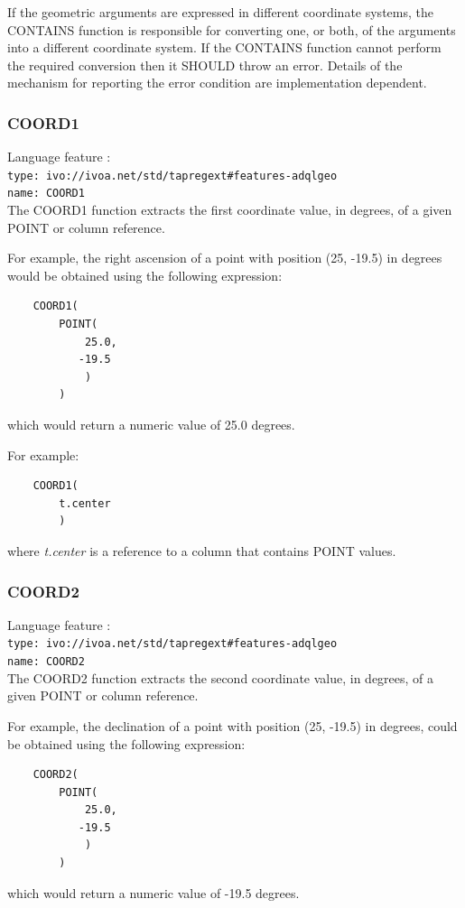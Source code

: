 \documentclass[11pt,a4paper]{ivoa}
\begin{document}
If the geometric arguments are expressed in different coordinate systems,
the CONTAINS function is responsible for converting one, or both, of the
arguments into a different coordinate system.
If the CONTAINS function cannot perform the required conversion then
it SHOULD throw an error.
Details of the mechanism for reporting the error condition are
implementation dependent.

\subsubsection{COORD1}
\label{sec:functions.geom.coord1}
{\footnotesize Language feature :}\\
{\footnotesize \verb|type: ivo://ivoa.net/std/tapregext#features-adqlgeo|}\\
{\footnotesize \verb|name: COORD1|}\\

The COORD1 function extracts the first coordinate value, in degrees, of a given
POINT  or column reference.

For example, the right ascension of a point with position (25, -19.5) in
degrees would be obtained using the following expression:
\begin{verbatim}
    COORD1(
        POINT(
            25.0,
           -19.5
            )
        )
\end{verbatim}
\noindent
which would return a numeric value of 25.0 degrees.

For example:
\begin{verbatim}
    COORD1(
        t.center
        )
\end{verbatim}
\noindent
where \textit{t.center} is a reference to a column that contains POINT values.

\subsubsection{COORD2}
\label{sec:functions.geom.coord2}
{\footnotesize Language feature :}\\
{\footnotesize \verb|type: ivo://ivoa.net/std/tapregext#features-adqlgeo|}\\
{\footnotesize \verb|name: COORD2|}\\

The COORD2 function extracts the second coordinate value, in degrees, of a given
POINT  or column reference.

For example, the declination of a point with position (25, -19.5) in degrees,
could be obtained using the following expression:
\begin{verbatim}
    COORD2(
        POINT(
            25.0,
           -19.5
            )
        )
\end{verbatim}
\noindent
which would return a numeric value of -19.5 degrees.
\end{document}
